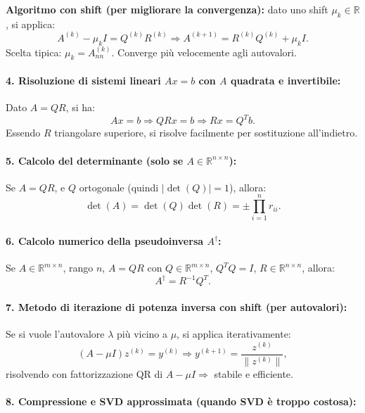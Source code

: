 \documentclass[12pt,a4paper]{article}
\begin{document}
\textbf{Algoritmo con shift (per migliorare la convergenza):} dato uno shift \( \mu_k \in \mathbb{R} \), si applica:
\[
A^{(k)} - \mu_k I = Q^{(k)} R^{(k)} \Rightarrow A^{(k+1)} = R^{(k)} Q^{(k)} + \mu_k I.
\]
Scelta tipica: \( \mu_k = A^{(k)}_{nn} \). Converge più velocemente agli autovalori.

\paragraph{4. Risoluzione di sistemi lineari \( Ax = b \) con \( A \) quadrata e invertibile:}

Dato \( A = QR \), si ha:
\[
Ax = b \Rightarrow QRx = b \Rightarrow Rx = Q^T b.
\]
Essendo \( R \) triangolare superiore, si risolve facilmente per sostituzione all'indietro.

\paragraph{5. Calcolo del determinante (solo se \( A \in \mathbb{R}^{n \times n} \)):}

Se \( A = QR \), e \( Q \) ortogonale (quindi \( |\det(Q)| = 1 \)), allora:
\[
\det(A) = \det(Q)\det(R) = \pm \prod_{i=1}^n r_{ii}.
\]

\paragraph{6. Calcolo numerico della pseudoinversa \( A^\dagger \):}

Se \( A \in \mathbb{R}^{m \times n} \), rango \( n \), \( A = QR \) con \( Q \in \mathbb{R}^{m \times n} \), \( Q^T Q = I \), \( R \in \mathbb{R}^{n \times n} \), allora:
\[
A^\dagger = R^{-1} Q^T.
\]

\paragraph{7. Metodo di iterazione di potenza inversa con shift (per autovalori):}

Se si vuole l’autovalore \( \lambda \) più vicino a \( \mu \), si applica iterativamente:
\[
(A - \mu I) z^{(k)} = y^{(k)} \Rightarrow y^{(k+1)} = \frac{z^{(k)}}{\|z^{(k)}\|},
\]
risolvendo con fattorizzazione QR di \( A - \mu I \Rightarrow \) stabile e efficiente.

\paragraph{8. Compressione e SVD approssimata (quando SVD è troppo costosa):}
\end{document}
